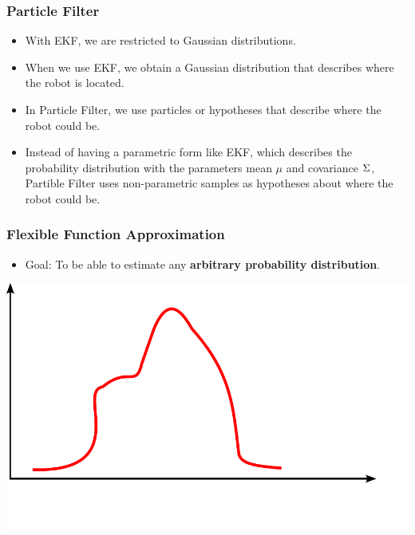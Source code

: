 \begin{frame}
    \frametitle{Particle Filter}
    \footnotesize
    \begin{itemize}
        \item With EKF, we are restricted to Gaussian distributions.
        \item When we use EKF, we obtain a Gaussian distribution that describes where the robot is located.
        \item In Particle Filter, we use particles or hypotheses that describe where the robot could be.
        \item Instead of having a parametric form like EKF, which describes the probability distribution with the parameters mean $\mu$ and covariance $\Sigma$, Partible Filter uses non-parametric samples as hypotheses about where the robot could be.
        
    \end{itemize}
    
    \begin{center}
    \end{center}
    
    
\end{frame}
    
\begin{frame}
    \frametitle{Flexible Function Approximation}
    \footnotesize
    
    \begin{itemize}
        \item Goal: To be able to estimate any \textbf{arbitrary probability distribution}.
    \end{itemize}
    
    \begin{center}
        \includegraphics[width=0.5\columnwidth]{./images/particle_filter/arbitrary_distribution.pdf}
    \end{center}
    
\end{frame}
    
